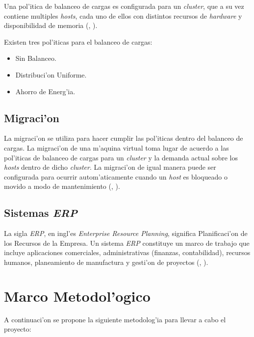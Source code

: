 Una pol'itica de balanceo de cargas es configurada para un \textit{cluster}, que a su vez contiene multiples \textit{hosts}, cada uno de ellos con distintos recursos de \textit{hardware} y disponibilidad de memoria (\citeauthor{redhat}, \citeyear{redhat}). 


Existen tres pol'iticas para el balanceo de cargas:
\begin{itemize}
	\item Sin Balanceo.
	\item Distribuci'on Uniforme.
	\item Ahorro de Energ'ia.
\end{itemize}

\subsection*{Migraci'on}

La migraci'on se utiliza para hacer cumplir las pol'iticas dentro del balanceo de cargas. La migraci'on de una m'aquina virtual toma lugar de acuerdo a las pol'iticas de balanceo de cargas para un \textit{cluster} y la demanda actual sobre los \textit{hosts} dentro de dicho \textit{cluster}. La migraci'on de igual manera puede ser configurada para ocurrir autom'aticamente cuando un \textit{host} es bloqueado o movido a modo de mantenimiento (\citeauthor{redhat}, \citeyear{redhat}).
\subsection*{Sistemas \textit{ERP}}

La sigla \textit{ERP}, en ingl'es \textit{Enterprise Resource Planning}, significa Planificaci'on de los Recursos de la Empresa. Un sistema \textit{ERP} constituye un marco de trabajo que incluye aplicaciones comerciales, administrativas (finanzas, contabilidad), recursos humanos, planeamiento de manufactura y gesti'on de proyectos (\citeauthor{saroka2002sistemas}, \citeyear{saroka2002sistemas}). 


\section{Marco Metodol'ogico}

A continuaci'on se propone la siguiente metodolog'ia para llevar a cabo el proyecto:

